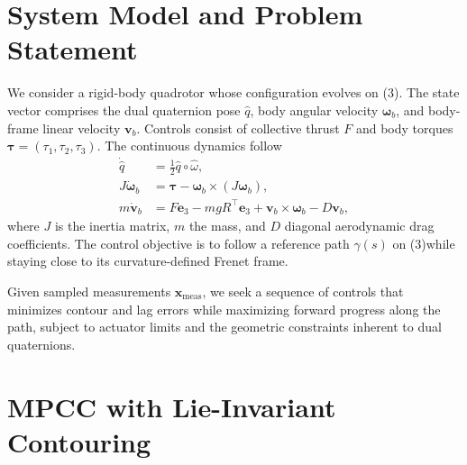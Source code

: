 \documentclass[letterpaper, 10pt, conference]{IEEEtran}
\newcommand{\SE}{\mathrm{SE}(3)}
\newcommand{\dq}{\hat{q}}
\begin{document}
\section{System Model and Problem Statement}
We consider a rigid-body quadrotor whose configuration evolves on \SE. The state vector comprises the dual quaternion pose $\dq$, body angular velocity $\boldsymbol{\omega}_b$, and body-frame linear velocity $\mathbf{v}_b$. Controls consist of collective thrust $F$ and body torques $\bm{\tau} = (\tau_1, \tau_2, \tau_3)$. The continuous dynamics follow
\begin{align}
    \dot{\dq} &= \tfrac{1}{2} \dq \circ \hat{\omega}, \\
    J \dot{\boldsymbol{\omega}}_b &= \bm{\tau} - \boldsymbol{\omega}_b \times (J \boldsymbol{\omega}_b), \\
    m \dot{\mathbf{v}}_b &= F \mathbf{e}_3 - m g R^\top \mathbf{e}_3 + \mathbf{v}_b \times \boldsymbol{\omega}_b - D \mathbf{v}_b,
\end{align}
where $J$ is the inertia matrix, $m$ the mass, and $D$ diagonal aerodynamic drag coefficients. The control objective is to follow a reference path $\gamma(s)$ on \SE while staying close to its curvature-defined Frenet frame.

Given sampled measurements $\mathbf{x}_\text{meas}$, we seek a sequence of controls that minimizes contour and lag errors while maximizing forward progress along the path, subject to actuator limits and the geometric constraints inherent to dual quaternions.

\section{MPCC with Lie-Invariant Contouring}
\label{sec:mpcc_lie}
\end{document}
